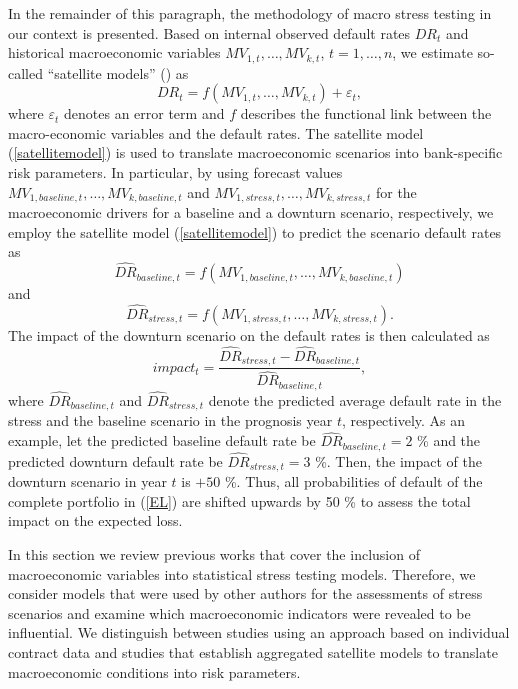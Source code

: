 \documentclass[a4paper, 11pt]{scrreprt}
\begin{document}
In the remainder of this paragraph, the methodology of macro stress testing in our context is presented.
Based on internal observed default rates $DR_t$ and historical macroeconomic variables $MV_{1,t}, \ldots, MV_{k,t}$, $t=1,\ldots,n$, we estimate so-called ``satellite models'' (\textcite[p. 17]{ecb2018srep}) as
\begin{equation}\label{satellitemodel}
DR_t = f(MV_{1,t}, \ldots, MV_{k,t}) + \varepsilon_t,
\end{equation}
where $\varepsilon_t$ denotes an error term and $f$ describes the functional link between the macro-economic variables and the default rates.
The satellite model (\ref{satellitemodel}) is used to translate macroeconomic scenarios into bank-specific risk parameters.
In particular, by using forecast values $MV_{1, baseline,t}, \ldots, MV_{k, baseline,t}$ and $MV_{1, stress,t}, \ldots, MV_{k, stress,t}$ for the macroeconomic drivers for a baseline and a downturn scenario, respectively, we employ the satellite model (\ref{satellitemodel}) to predict the scenario default rates as
\begin{equation}\label{satellitemodel_forecast_baseline}
\widehat{DR}_{baseline,t} = f(MV_{1, baseline,t}, \ldots, MV_{k, baseline,t})
\end{equation}
and
\begin{equation}\label{satellitemodel_forecast_stress}
\widehat{DR}_{stress,t} = f(MV_{1, stress,t}, \ldots, MV_{k, stress,t}).
\end{equation}
The impact of the downturn scenario on the default rates is then calculated as
\begin{equation}\label{stressimpact}
impact_t = \frac{\widehat{DR}_{stress,t} - \widehat{DR}_{baseline,t}}{\widehat{DR}_{baseline,t}},
\end{equation}
where $\widehat{DR}_{baseline,t}$ and $\widehat{DR}_{stress,t}$ denote the predicted average default rate in the stress and the baseline scenario in the prognosis year $t$, respectively. As an example, let the predicted baseline default rate be $\widehat{DR}_{baseline,t} = 2$ \% and the predicted downturn default rate be $\widehat{DR}_{stress,t} = 3$ \%. Then, the impact of the downturn scenario in year $t$ is $+50$ \%. Thus, all probabilities of default of the complete portfolio in (\ref{EL}) are shifted upwards by 50 \% to assess the total impact on the expected loss.




\bigskip

In this section we review previous works that cover the inclusion of macroeconomic variables into statistical stress testing models. Therefore, we consider models that were used by other authors for the assessments of stress scenarios and examine which macroeconomic indicators were revealed to be influential.
We distinguish between studies using an approach based on individual contract data and studies that establish aggregated satellite models to translate macroeconomic conditions into risk parameters.
\end{document}
